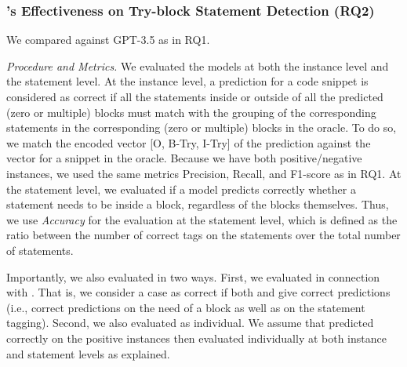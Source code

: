 \subsubsection{{\xstate}'s Effectiveness on Try-block Statement Detection (RQ2)}

 We compared {\xstate} against GPT-3.5 as in RQ1.




{\em Procedure and Metrics.} We evaluated the models at both the
instance level and the statement level. At the instance level, a
prediction for a code snippet is considered as correct if all the
statements inside or outside of all the predicted (zero or
multiple)  blocks must match with the grouping of the
corresponding statements in the corresponding (zero or
multiple)  blocks in the oracle. To do so, we match
the encoded vector [O, B-Try, I-Try] of the prediction against the
vector for a snippet in the oracle. Because we have both
positive/negative instances, we used the same metrics Precision,
Recall, and F1-score as in RQ1. At the statement level, we evaluated
if a model predicts correctly whether a statement needs to be inside
a  block, regardless of the blocks themselves. Thus,
we use {\em Accuracy} for the evaluation at the statement level, which is
defined as the ratio between the number of correct tags on the
statements over the total number of statements.

Importantly, we also evaluated {\tool} in two ways. First, we
evaluated {\xstate} in connection with {\xblock}. That is, we consider
a case as correct if both {\xblock} and {\xstate} give correct
predictions (i.e., correct predictions on the need of
a  block as well as on the statement tagging). Second,
we also evaluated {\xstate} as individual. We assume that {\xblock}
predicted correctly on the positive instances then evaluated {\xstate}
individually at both instance and statement levels as explained.

